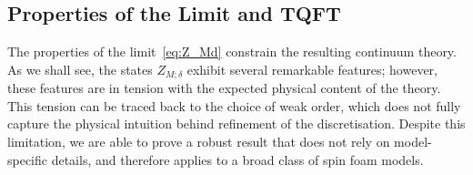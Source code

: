 \documentclass[11pt]{article}
\theoremstyle{definition}
\numberwithin{equation}{section}
\begin{document}
\subsection{Properties of the Limit and TQFT}\label{Sec:weaklimTQFT}

The properties of the limit~\eqref{eq:Z_Md} constrain the resulting continuum theory. As we shall see, the states $Z_{M;\delta}$ exhibit several remarkable features; however, these features are in tension with the expected physical content of the theory. This tension can be traced back to the choice of weak order, which does not fully capture the physical intuition behind refinement of the discretisation. Despite this limitation, we are able to prove a robust result that does not rely on model-specific details, and therefore applies to a broad class of spin foam models.

\smallskip
\end{document}
